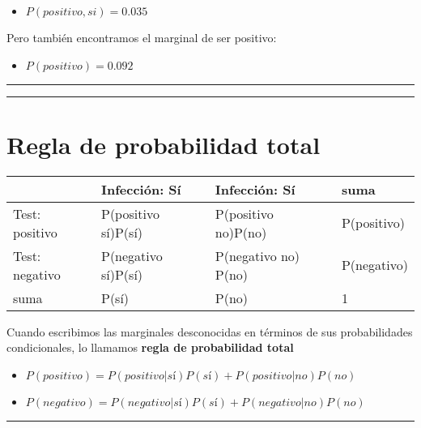 \documentclass[
]{book}
\providecommand{\tightlist}{%
  \setlength{\itemsep}{0pt}\setlength{\parskip}{0pt}}
\begin{document}
\begin{itemize}
\tightlist
\item
  \(P(positivo,si)= 0.035\)
\end{itemize}

Pero también encontramos el marginal de ser positivo:

\begin{itemize}
\tightlist
\item
  \(P(positivo)=0.092\)
\end{itemize}

\begin{center}\rule{0.5\linewidth}{0.5pt}\end{center}

\begin{center}\rule{0.5\linewidth}{0.5pt}\end{center}

\hypertarget{regla-de-probabilidad-total}{%
\section{Regla de probabilidad total}\label{regla-de-probabilidad-total}}

\begin{longtable}[]{@{}llll@{}}
\toprule
& Infección: Sí & Infección: Sí & suma \\
\midrule
\endhead
Test: positivo & P(positivo {\textbar{}} sí)P(sí) & P(positivo {\textbar{}} no)P(no) & P(positivo) \\
Test: negativo & P(negativo {\textbar{}} sí)P(sí) & P(negativo {\textbar{}} no) P(no) & P(negativo) \\
suma & P(sí) & P(no) & 1 \\
\bottomrule
\end{longtable}

Cuando escribimos las marginales desconocidas en términos de sus probabilidades condicionales, lo llamamos \textbf{regla de probabilidad total}

\begin{itemize}
\tightlist
\item
  \(P(positivo)=P(positivo|sí)P(sí)+P(positivo|no)P(no)\)
\item
  \(P(negativo)=P(negativo|sí)P(sí)+P(negativo|no)P(no)\)
\end{itemize}

\begin{center}\rule{0.5\linewidth}{0.5pt}\end{center}
\end{document}
